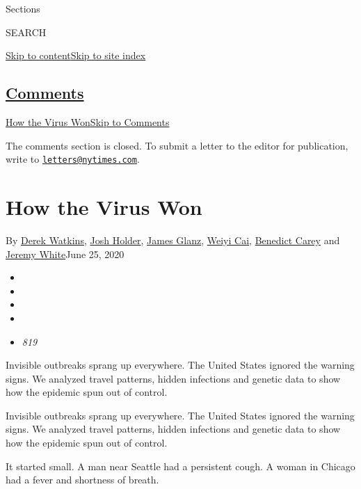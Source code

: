 Sections

SEARCH

\protect\hyperlink{site-content}{Skip to
content}\protect\hyperlink{site-index}{Skip to site index}

\hypertarget{comments}{%
\subsection{\texorpdfstring{\protect\hyperlink{commentsContainer}{Comments}}{Comments}}\label{comments}}

\href{}{How the Virus Won}\href{}{Skip to Comments}

The comments section is closed. To submit a letter to the editor for
publication, write to
\href{mailto:letters@nytimes.com}{\nolinkurl{letters@nytimes.com}}.

\hypertarget{how-the-virus-won}{%
\section{How the Virus Won}\label{how-the-virus-won}}

By \href{https://www.nytimes.com/by/derek-watkins}{Derek Watkins},
\href{https://www.nytimes.com/by/josh-holder}{Josh Holder},
\href{https://www.nytimes.com/by/james-glanz}{James Glanz},
\href{https://www.nytimes.com/by/weiyi-cai}{Weiyi Cai},
\href{https://www.nytimes.com/by/benedict-carey}{Benedict Carey} and
\href{https://www.nytimes.com/by/jeremy-white}{Jeremy White}June 25,
2020

\begin{itemize}
\item
\item
\item
\item
\item
  \emph{819}
\end{itemize}

Invisible outbreaks sprang up everywhere. The United States ignored the
warning signs. We analyzed travel patterns, hidden infections and
genetic data to show how the epidemic spun out of control.

Invisible outbreaks sprang up everywhere. The United States ignored the
warning signs. We analyzed travel patterns, hidden infections and
genetic data to show how the epidemic spun out of control.

It started small. A man near Seattle had a persistent cough. A woman in
Chicago had a fever and shortness of breath.

